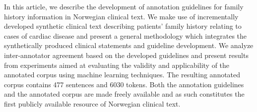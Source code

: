 In this article, we describe the development of annotation guidelines for family history information in Norwegian clinical text. We make use of incrementally developed synthetic clinical text describing patients' family history relating to cases of cardiac disease and present a general methodology which integrates the synthetically produced clinical statements and guideline development. We analyze inter-annotator agreement based on the developed guidelines and present results from experiments aimed at evaluating the validity and applicability of the annotated corpus using machine learning techniques. The resulting annotated corpus contains 477 sentences and 6030 tokens. Both the annotation guidelines and the annotated corpus are made freely available and as such constitutes the first publicly available resource of Norwegian clinical text.
